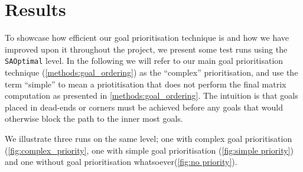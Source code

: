 \section{Results}
\label{sec:results}


To showcase how efficient our goal prioritisation technique is and how we have improved upon it throughout the project, we present some test runs using the \texttt{SAOptimal} level.
In the following we will refer to our main goal prioritisation technique (\cref{methods:goal_ordering}) as the ``complex'' prioritisation, and use the term ``simple'' to mean a priotitisation that does not perform the final matrix computation as presented in \cref{methods:goal_ordering}.
The intuition is that goals placed in dead-ends or corners must be achieved before any goals that would otherwise block the path to the inner most goals.

We illustrate three runs on the same level; one with complex goal prioritisation (\cref{fig:complex_priority}, one with simple goal prioritisation (\cref{fig:simple priority}) and one without goal prioritisation whatsoever(\cref{fig:no priority}). 

